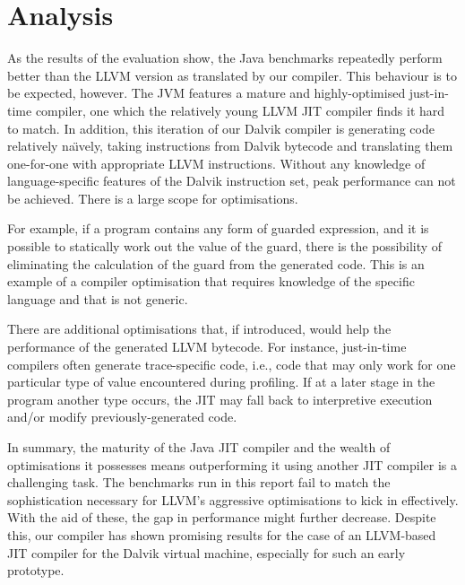 \section{Analysis}
\label{sec:analysis}

As the results of the evaluation show, the Java benchmarks repeatedly perform better than the LLVM version as translated by our compiler. This behaviour is to be expected, however. The JVM features a mature and highly-optimised just-in-time compiler, one which the relatively young LLVM JIT compiler finds it hard to match. In addition, this iteration of our Dalvik compiler is generating code relatively na\"{\i}vely, taking instructions from Dalvik bytecode and translating them one-for-one with appropriate LLVM instructions. Without any knowledge of language-specific features of the Dalvik instruction set, peak performance can not be achieved. There is a large scope for optimisations.

For example, if a program contains any form of guarded expression, and it is possible to statically work out the value of the guard, there is the possibility of eliminating the calculation of the guard from the generated code. This is an example of a compiler optimisation that requires knowledge of the specific language and that is not generic.

There are additional optimisations that, if introduced, would help the performance of the generated LLVM bytecode. For instance, just-in-time compilers often generate trace-specific code, i.e., code that may only work for one particular type of value encountered during profiling. If at a later stage in the program another type occurs, the JIT may fall back to interpretive execution and/or modify previously-generated code.

In summary, the maturity of the Java JIT compiler and the wealth of optimisations it possesses means outperforming it using another JIT compiler is a challenging task. The benchmarks run in this report fail to match the sophistication necessary for LLVM's aggressive optimisations to kick in effectively. With the aid of these, the gap in performance might further decrease. Despite this, our compiler has shown promising results for the case of an LLVM-based JIT compiler for the Dalvik virtual machine, especially for such an early prototype.
